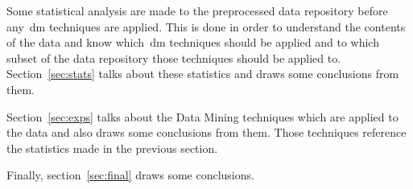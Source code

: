 Some statistical analysis are made to the preprocessed data repository before
any~\gls{dm} techniques are applied. This is done in order to understand the
contents of the data and know which~\gls{dm} techniques should be applied and
to which subset of the data repository those techniques should be applied to.
Section~\ref{sec:stats} talks about these statistics and draws some conclusions
from them.

Section~\ref{sec:exps} talks about the Data Mining techniques which are applied
to the data and also draws some conclusions from them. Those techniques
reference the statistics made in the previous section.

Finally, section~\ref{sec:final} draws some conclusions.

